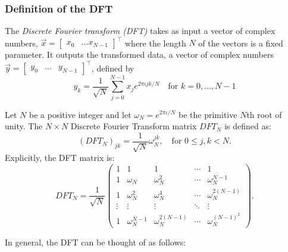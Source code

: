 \subsubsection{Definition of the DFT}
\begin{definition}
    The \textit{Discrete Fourier transform (DFT)} takes as input a vector of complex numbers, \( \vec{x} = \begin{bmatrix}
        x_0 & \ldots x_{N-1}        
    \end{bmatrix}^\top\) where the length $N$ of the vectors is a fixed parameter. It outputs the transformed data, a vector of complex numbers \(\vec{y}= \begin{bmatrix} y_0 & \ldots & y_{N-1}\end{bmatrix}^\top\), defined by
\begin{equation}
y_k = \frac{1}{\sqrt{N}} \sum_{j=0}^{N-1} x_je^{2\pi\iota jk/N} \quad \text{for } k=0,\ldots,N-1
\label{eq:dft}
\end{equation}
\end{definition}
\begin{definition}

Let $N$ be a positive integer and let \(\omega_N = e^{2\pi\iota / N}\) be the primitive $N$th root of unity. The \(N \times N\) Discrete Fourier Transform matrix $DFT_N$ is defined as:
\begin{equation}
    (DFT_N)_{jk} = \frac{1}{\sqrt{N}} \omega_N^{jk}, \quad \text{for } 0 \leq j,k < N.
    \label{eq:dft_matrix_entry}
\end{equation}
Explicitly, the DFT matrix is:
\begin{equation}
    DFT_N = \frac{1}{\sqrt{N}}\begin{pmatrix}
        1 & 1 & 1 & \cdots & 1 \\
        1 & \omega_N & \omega_N^2 & \cdots & \omega_N^{N-1} \\
        1 & \omega_N^2 & \omega_N^4 & \cdots & \omega_N^{2(N-1)} \\
        \vdots & \vdots & \vdots & \ddots & \vdots \\
        1 & \omega_N^{N-1} & \omega_N^{2(N-1)} & \cdots & \omega_N^{(N-1)^2}
    \end{pmatrix}.
    \label{eq:dft_matrix}
\end{equation}
\end{definition}
In general, the DFT can be thought of as follows:
